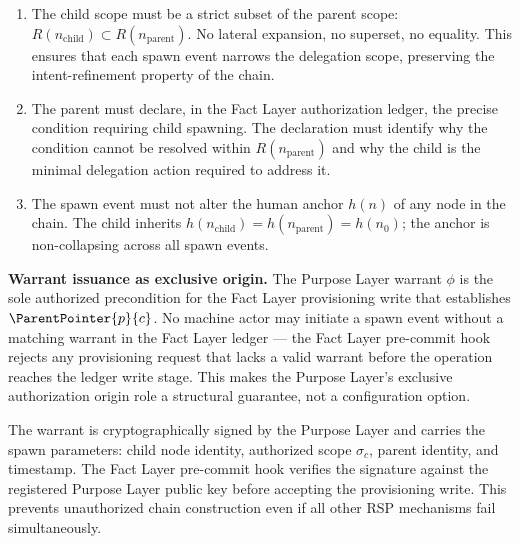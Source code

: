 \begin{enumerate}
    \item[(S1) \textbf{Scope refinement.}] The child scope must be a strict subset of the parent scope: $R(n_{\mathrm{child}}) \subset R(n_{\mathrm{parent}})$. No lateral expansion, no superset, no equality. This ensures that each spawn event narrows the delegation scope, preserving the intent-refinement property of the chain.

    \item[(S2) \textbf{Operational necessity.}] The parent must declare, in the Fact Layer authorization ledger, the precise condition requiring child spawning. The declaration must identify why the condition cannot be resolved within $R(n_{\mathrm{parent}})$ and why the child is the minimal delegation action required to address it.

    \item[(S3) \textbf{Human anchor consistency.}] The spawn event must not alter the human anchor $h(n)$ of any node in the chain. The child inherits $h(n_{\mathrm{child}}) = h(n_{\mathrm{parent}}) = h(n_0)$; the anchor is non-collapsing across all spawn events.
\end{enumerate}

\medskip
\noindent\textbf{Warrant issuance as exclusive origin.} The Purpose Layer warrant $\phi$ is the sole authorized precondition for the Fact Layer provisioning write that establishes $\ParentPointer{p}{c}$. No machine actor may initiate a spawn event without a matching warrant in the Fact Layer ledger — the Fact Layer pre-commit hook rejects any provisioning request that lacks a valid warrant before the operation reaches the ledger write stage. This makes the Purpose Layer's exclusive authorization origin role a structural guarantee, not a configuration option.

The warrant is cryptographically signed by the Purpose Layer and carries the spawn parameters: child node identity, authorized scope $\sigma_c$, parent identity, and timestamp. The Fact Layer pre-commit hook verifies the signature against the registered Purpose Layer public key before accepting the provisioning write. This prevents unauthorized chain construction even if all other RSP mechanisms fail simultaneously.

